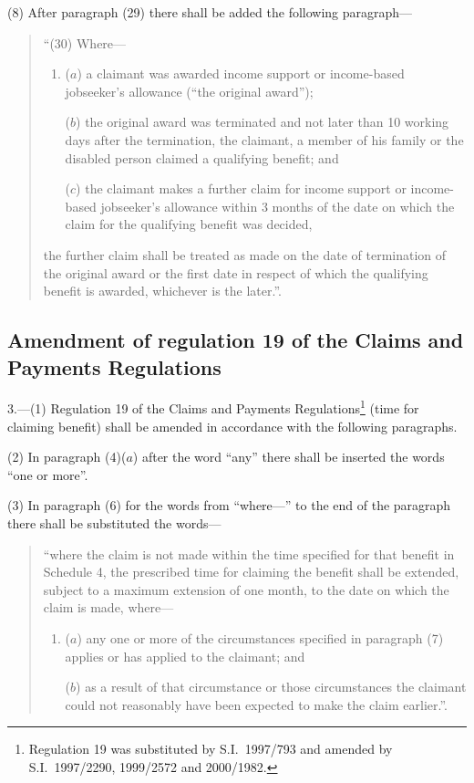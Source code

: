 \documentclass[12pt,a4paper]{article}
\begin{document}
(8) After paragraph (29) there shall be added the following paragraph—
\begin{quotation}
“(30) Where—
\begin{enumerate}\item[]
($a$) a claimant was awarded income support or income-based jobseeker’s allowance (“the original award”);

($b$) the original award was terminated and not later than 10 working days after the termination, the claimant, a member of his family or the disabled person claimed a qualifying benefit; and

($c$) the claimant makes a further claim for income support or income-based jobseeker’s allowance within 3 months of the date on which the claim for the qualifying benefit was decided,
\end{enumerate}
the further claim shall be treated as made on the date of termination of the original award or the first date in respect of which the qualifying benefit is awarded, whichever is the later.”.
\end{quotation}

\subsection[3. Amendment of regulation 19 of the Claims and Payments Regulations]{Amendment of regulation 19 of the Claims and Payments Regulations}

3.---(1)  Regulation 19 of the Claims and Payments Regulations\footnote{Regulation 19 was substituted by S.I.\ 1997/793 and amended by S.I.\ 1997/2290, 1999/2572 and 2000/1982.} (time for claiming benefit) shall be amended in accordance with the following paragraphs.

(2) In paragraph (4)($a$)  after the word “any” there shall be inserted the words “one or more”.

(3) In paragraph (6) for the words from “where---” to the end of the paragraph there shall be substituted the words—
\begin{quotation}
    “where the claim is not made within the time specified for that benefit in Schedule 4, the prescribed time for claiming the benefit shall be extended, subject to a maximum extension of one month, to the date on which the claim is made, where—
\begin{enumerate}\item[]
    ($a$) 
    any one or more of the circumstances specified in paragraph (7) applies or has applied to the claimant; and

    ($b$) 
    as a result of that circumstance or those circumstances the claimant could not reasonably have been expected to make the claim earlier.”. 
\end{enumerate}
\end{quotation}
\end{document}
